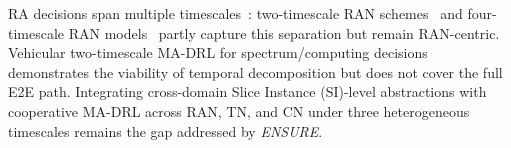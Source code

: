 \documentclass[12pt,lettersize,journal,onecolumn]{IEEEtran}
\begin{document}
RA decisions span multiple timescales~\cite{comst24ebrahimi}: two-timescale RAN schemes~\cite{jiot24filali,jsac24zangooei} and four-timescale RAN models~\cite{twc25ataeebojd} partly capture this separation but remain RAN-centric. Vehicular two-timescale MA-DRL for spectrum/computing decisions~\cite{tnsm24lu} demonstrates the viability of temporal decomposition but does not cover the full E2E path. Integrating cross-domain Slice Instance (SI)-level abstractions with cooperative MA-DRL across RAN, TN, and CN under three heterogeneous timescales remains the gap addressed by \textit{ENSURE}.

\end{document}
